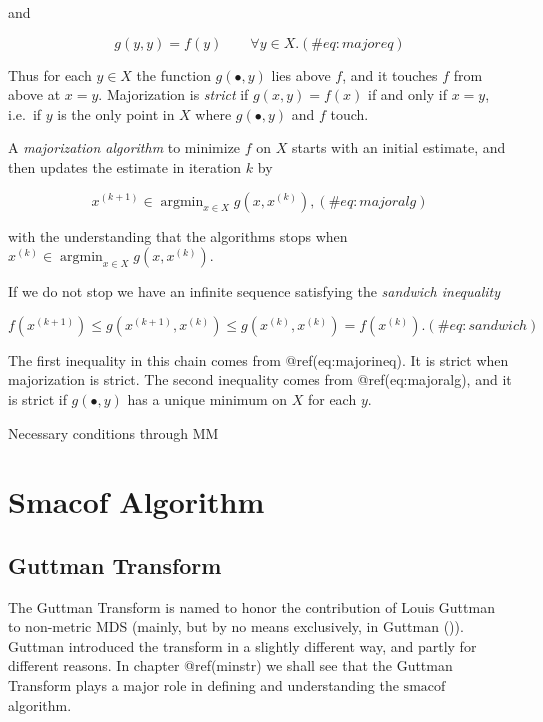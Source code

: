 \documentclass[
  12pt,
  letterpaper,
  DIV=11,
  numbers=noendperiod]{scrreprt}
\theoremstyle{remark}
\begin{document}
and

\begin{equation}
g(y,y)=f(y)\qquad\forall y\in X.
(\#eq:majoreq)
\end{equation}

Thus for each \(y\in X\) the function \(g(\bullet,y)\) lies above \(f\),
and it touches \(f\) from above at \(x=y\). Majorization is
\emph{strict} if \(g(x,y)=f(x)\) if and only if \(x=y\), i.e.~if \(y\)
is the only point in \(X\) where \(g(\bullet,y)\) and \(f\) touch.

A \emph{majorization algorithm} to minimize \(f\) on \(X\) starts with
an initial estimate, and then updates the estimate in iteration \(k\) by

\begin{equation}
x^{(k+1)}\in\mathop{\text{argmin}}_{x\in X}g(x,x^{(k)}),
(\#eq:majoralg)
\end{equation}

with the understanding that the algorithms stops when
\(x^{(k)}\in\mathop{\text{argmin}}_{x\in X}g(x,x^{(k)})\).

If we do not stop we have an infinite sequence satisfying the
\emph{sandwich inequality}

\begin{equation}
f(x^{(k+1)})\leq g(x^{(k+1)},x^{(k)})\leq g(x^{(k)},x^{(k)})=f(x^{(k)}).
(\#eq:sandwich)
\end{equation}

The first inequality in this chain comes from @ref(eq:majorineq). It is
strict when majorization is strict. The second inequality comes from
@ref(eq:majoralg), and it is strict if \(g(\bullet,y)\) has a unique
minimum on \(X\) for each \(y\).

Necessary conditions through MM

\section{Smacof Algorithm}\label{smacof-algorithm}

\subsection{Guttman Transform}\label{propguttman}

The Guttman Transform is named to honor the contribution of Louis
Guttman to non-metric MDS (mainly, but by no means exclusively, in
Guttman ()). Guttman introduced the
transform in a slightly different way, and partly for different reasons.
In chapter @ref(minstr) we shall see that the Guttman Transform plays a
major role in defining and understanding the \(\textrm{smacof}\)
algorithm.
\end{document}
